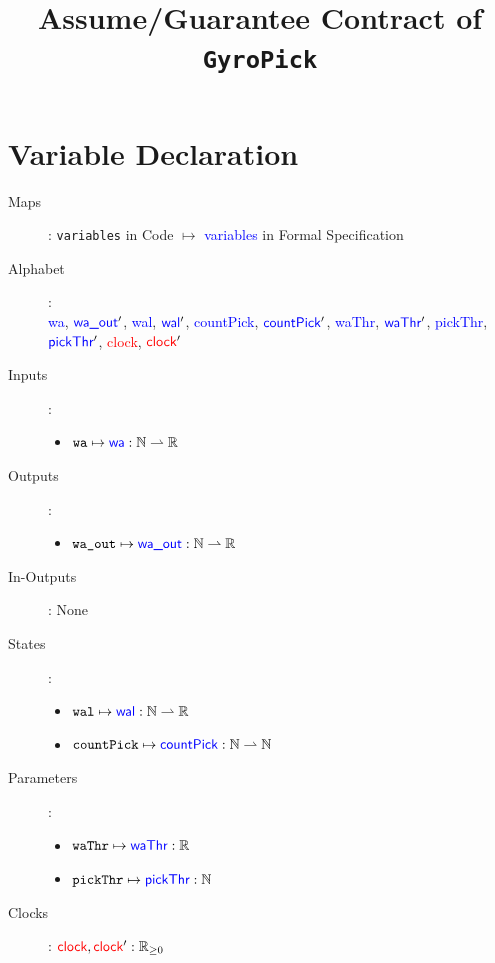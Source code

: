\documentclass[fleqn,a4paper]{article}
\newcommand\var[1]{\texttt{#1}}
\newcommand\Var[1]{\textcolor{blue}{\textsf{#1}}}
\newcommand\clock{\textcolor{red}{\textsf{clock}}}
\begin{document}
\title{Assume/Guarantee Contract of \texttt{GyroPick}}
\author{}

\maketitle

\section{Variable Declaration}

\begin{description}
\item[Maps]:
\var{variables} in Code $\mapsto$ \Var{variables} in Formal Specification

\item[Alphabet]: \\
\Var{wa},
$\Var{wa\_out}'$,
\Var{wal},
$\Var{wal}'$,
\Var{countPick},
$\Var{countPick}'$,
\Var{waThr},
$\Var{waThr}'$,
\Var{pickThr},
$\Var{pickThr}'$,
\clock,
$\clock'$

\item[Inputs]:
\begin{itemize}
\item $\var{wa} \mapsto \Var{wa} : \mathbb{N} \rightharpoonup \mathbb{R}$
\end{itemize}

\item[Outputs]:
\begin{itemize}
\item $\var{wa\_out} \mapsto \Var{wa\_out} : \mathbb{N} \rightharpoonup \mathbb{R}$
\end{itemize}

\item[In-Outputs]: None

\item[States]:
\begin{itemize}
\item $\var{wal} \mapsto \Var{wal} : \mathbb{N} \rightharpoonup \mathbb{R}$
\item $\var{countPick} \mapsto \Var{countPick} : \mathbb{N} \rightharpoonup \mathbb{N}$
\end{itemize}

\item[Parameters]:
\begin{itemize}
\item $\var{waThr} \mapsto \Var{waThr} : \mathbb{R}$
\item $\var{pickThr} \mapsto \Var{pickThr} : \mathbb{N}$
\end{itemize}

\item[Clocks]:
$\clock, \clock' : \mathbb{R}_{\geq 0}$

\end{description}
\end{document}
